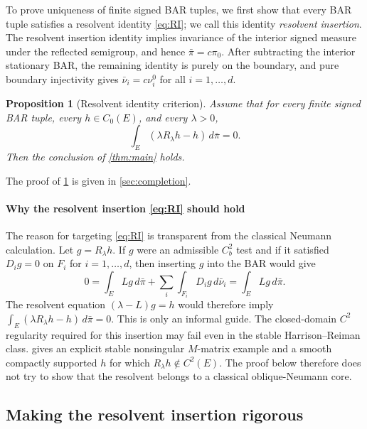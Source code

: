 \documentclass[aihp]{imsart}
\numberwithin{equation}{section}
\theoremstyle{plain}
\newtheorem{proposition}[proposition]{Proposition}
\theoremstyle{definition}
\newcommand{\1}{\mathbf 1}
\begin{document}
To prove uniqueness of finite signed BAR tuples, we first show that every BAR tuple satisfies a resolvent identity \eqref{eq:RI}; we call this identity \emph{resolvent insertion}. The resolvent insertion identity implies invariance of the interior signed measure under the reflected semigroup, and hence \(\bar{\pi}=c\pi_0\). After subtracting the interior stationary BAR, the remaining identity is purely on the boundary, and pure boundary injectivity gives \(\bar{\nu}_i=c\nu_i^0\) for all \(i=1,\ldots,d\).

\begin{proposition}[Resolvent identity criterion]\label{prop:RI-criterion}
Assume that for every finite signed BAR tuple, every $h\in C_0(E)$, and every $\lambda>0$,
\begin{equation}\label{eq:RI}
\tag{RI}
 \int_E(\lambda R_\lambda h-h)\,d\bar\pi=0.
\end{equation}
Then the conclusion of \cref{thm:main} holds.
\end{proposition}

The proof of \cref{prop:RI-criterion} is given in \cref{sec:completion}. 

\paragraph{Why the resolvent insertion \eqref{eq:RI} should hold} The reason for targeting \eqref{eq:RI} is transparent from the classical Neumann calculation.  Let $g=R_\lambda h$.  If $g$ were an admissible $C_b^2$ test and if it satisfied $D_i g=0$ on $F_i$ for $i=1,\ldots,d$, then inserting $g$ into the BAR would give
\[
0=\int_E Lg\,d\bar\pi+
  \sum_i\int_{F_i}D_i g\,d\bar\nu_i
 =\int_E Lg\,d\bar\pi.
\]
The resolvent equation $(\lambda-L)g=h$ would therefore imply $ \int_E(\lambda R_\lambda h-h)\,d\bar\pi=0.$ This is only an informal guide.  The closed-domain $C^2$ regularity required for this insertion may fail even in the stable Harrison--Reiman class.   gives an explicit stable nonsingular $M$-matrix example and a smooth compactly supported $h$ for which $R_\lambda h\notin C^2(E)$.  The proof below therefore does not try to show that the resolvent belongs to a classical oblique-Neumann core.


\subsection{Making the resolvent insertion rigorous}
\end{document}
